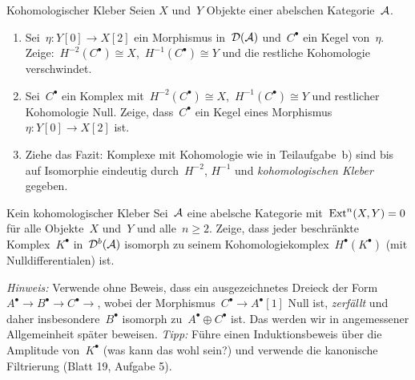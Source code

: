 \documentclass{uebblatt}
\begin{document}
\begin{aufgabe}{Kohomologischer Kleber}
Seien $X$ und~$Y$ Objekte einer abelschen Kategorie~$\mathcal{A}$.
\begin{enumerate}
\item Sei~$\eta : Y[0] \to X[2]$ ein Morphismus in~$\mathcal{D}(\mathcal{A})$ und~$C^\bullet$ ein Kegel
von~$\eta$. \\ Zeige:~$H^{-2}(C^\bullet) \cong X$,~$H^{-1}(C^\bullet)
\cong Y$ und die restliche Kohomologie verschwindet.
\item Sei~$C^\bullet$ ein Komplex mit~$H^{-2}(C^\bullet) \cong
X$,~$H^{-1}(C^\bullet) \cong Y$ und restlicher Kohomologie Null. Zeige, dass~$C^\bullet$
ein Kegel eines Morphismus~$\eta : Y[0] \to X[2]$ ist.
\item Ziehe das Fazit: Komplexe mit Kohomologie wie in Teilaufgabe~b) sind
bis auf Isomorphie eindeutig durch~$H^{-2}$, $H^{-1}$ und \emph{kohomologischen
Kleber} gegeben.
\end{enumerate}
\end{aufgabe}

\begin{aufgabe}{Kein kohomologischer Kleber}
Sei~$\mathcal{A}$ eine abelsche Kategorie mit~$\mathrm{Ext}^n(X,Y) = 0$ für alle Objekte~$X$ und~$Y$
und alle~$n \geq 2$. Zeige, dass jeder beschränkte Komplex~$K^\bullet$
in~$\mathcal{D}^b(\mathcal{A})$ isomorph zu seinem Kohomologiekomplex~$H^\bullet(K^\bullet)$ (mit
Nulldifferentialen) ist.

{\scriptsize \emph{Hinweis:} Verwende ohne Beweis, dass ein ausgezeichnetes
Dreieck der Form~$A^\bullet \to B^\bullet \to C^\bullet \to$, wobei der
Morphismus~$C^\bullet \to A^\bullet[1]$ Null ist, \emph{zerfällt} und daher
insbesondere~$B^\bullet$ isomorph zu~$A^\bullet \oplus C^\bullet$ ist. Das
werden wir in angemessener Allgemeinheit später beweisen.
\emph{Tipp:}
Führe einen Induktionsbeweis über die Amplitude von~$K^\bullet$
(was kann das wohl sein?) und verwende die kanonische Filtrierung (Blatt 19,
Aufgabe 5).\par}
\end{aufgabe}
\end{document}
